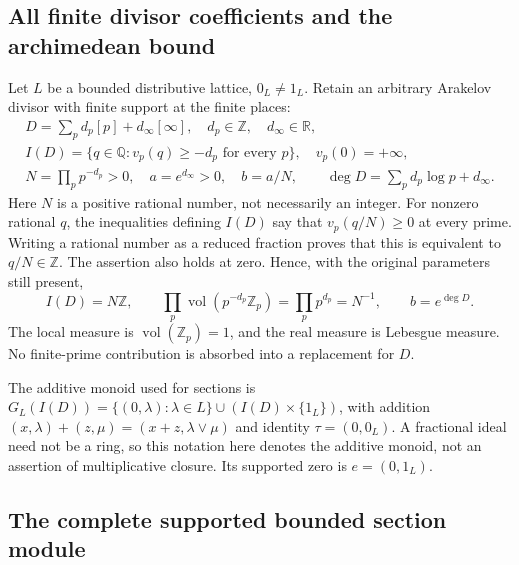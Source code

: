 \subsection{All finite divisor coefficients and the archimedean bound}

Let $L$ be a bounded distributive lattice, $0_L\ne1_L$. Retain an
arbitrary Arakelov divisor with finite support at the finite places:
\begin{equation}\tag{RDT1}
\begin{gathered}
D=\sum_p d_p[p]+d_\infty[\infty],\quad
d_p\in\mathbb Z,\quad d_\infty\in\mathbb R,\\
I(D)=\{q\in\mathbb Q:v_p(q)\ge-d_p\text{ for every }p\},\quad
v_p(0)=+\infty,\\
N=\prod_p p^{-d_p}>0,\quad a=e^{d_\infty}>0,\quad b=a/N,\qquad
\deg D=\sum_p d_p\log p+d_\infty.
\end{gathered}
\end{equation}
Here $N$ is a positive rational number, not necessarily an integer.
For nonzero rational $q$, the inequalities defining $I(D)$ say that
$v_p(q/N)\ge0$ at every prime. Writing a rational number as a reduced
fraction proves that this is equivalent to $q/N\in\mathbb Z$.
The assertion also holds at zero. Hence, with the original parameters
still present,
\begin{equation}\tag{RDT2}
I(D)=N\mathbb Z,\qquad
\prod_p\operatorname{vol}(p^{-d_p}\mathbb Z_p)
=\prod_p p^{d_p}=N^{-1},\qquad b=e^{\deg D}.
\end{equation}
The local measure is $\operatorname{vol}(\mathbb Z_p)=1$, and the
real measure is Lebesgue measure. No finite-prime contribution is
absorbed into a replacement for $D$.

The additive monoid used for sections is
$G_L(I(D))=\{(0,\lambda):\lambda\in L\}\cup
(I(D)\times\{1_L\})$, with addition
$(x,\lambda)+(z,\mu)=(x+z,\lambda\vee\mu)$ and identity
$\tau=(0,0_L)$. A fractional ideal need not be a ring, so this
notation here denotes the additive monoid, not an assertion of
multiplicative closure. Its supported zero is $e=(0,1_L)$.

\subsection{The complete supported bounded section module}

